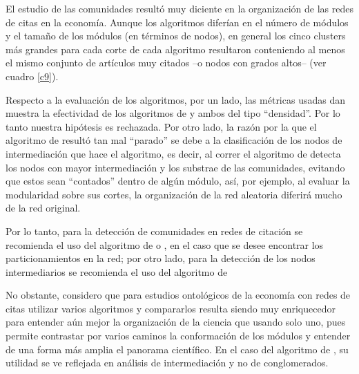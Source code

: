\documentclass[12pt,letter]{article}
\begin{document}
\vspace{0.5cm}

El estudio de las comunidades resultó muy diciente en la organización de las redes de citas en la economía. Aunque los algoritmos diferían en el número de módulos y el tamaño de los módulos (en términos de nodos), en general los cinco clusters más grandes para cada corte de cada algoritmo resultaron conteniendo al menos el mismo conjunto de artículos muy citados --o nodos con grados altos-- (ver cuadro \ref{c9}).

\vspace{0.5cm}

Respecto a la evaluación de los algoritmos, por un lado, las métricas usadas dan muestra la efectividad de los algoritmos de \cite{Blondel} y \cite{Clauset} ambos del tipo ``densidad''. Por lo tanto nuestra hipótesis es rechazada. Por otro lado, la razón por la que el algoritmo de \cite{Girvan1, Girvan2} resultó tan mal ``parado'' se debe a la clasificación de los nodos de intermediación que hace el algoritmo, es decir, al correr el algoritmo de \cite{Girvan1, Girvan2} detecta los nodos con mayor intermediación y los substrae de las comunidades, evitando que estos sean ``contados'' dentro de algún módulo, así, por ejemplo, al evaluar la modularidad sobre sus cortes, la organización de la red aleatoria diferirá mucho de la red original.

\vspace{0.5cm}

Por lo tanto, para la detección de comunidades en redes de citación se recomienda el uso del algoritmo de \cite{Blondel} o \cite{Clauset}, en el caso que se desee encontrar los particionamientos en la red; por otro lado, para la detección de los nodos intermediarios se recomienda el uso del algoritmo de \cite{Girvan1, Girvan2}

\vspace{0.5cm}

No obstante, considero que para estudios ontológicos de la economía con redes de citas utilizar varios algoritmos y compararlos resulta siendo muy enriquecedor para entender aún mejor la organización de la ciencia que usando solo uno, pues permite contrastar por varios caminos la conformación de los módulos y entender de una forma más amplia el panorama científico. En el caso del algoritmo de \cite{Girvan1, Girvan2}, su utilidad se ve reflejada en análisis de intermediación y no de conglomerados.


\vspace{0.5cm}
\end{document}

